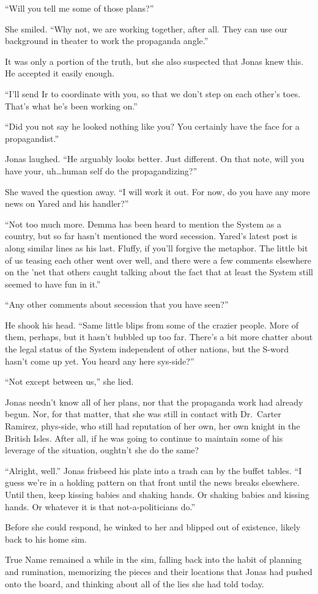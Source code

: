 ``Will you tell me some of those plans?''

She smiled. ``Why not, we are working together, after all. They can use our background in theater to work the propaganda angle.''

It was only a portion of the truth, but she also suspected that Jonas knew this. He accepted it easily enough.

``I'll send Ir to coordinate with you, so that we don't step on each other's toes. That's what he's been working on.''

``Did you not say he looked nothing like you? You certainly have the face for a propagandist.''

Jonas laughed. ``He arguably looks better. Just different. On that note, will you have your, uh\ldots human self do the propagandizing?''

She waved the question away. ``I will work it out. For now, do you have any more news on Yared and his handler?''

``Not too much more. Demma has been heard to mention the System as a country, but so far hasn't mentioned the word secession. Yared's latest post is along similar lines as his last. Fluffy, if you'll forgive the metaphor. The little bit of us teasing each other went over well, and there were a few comments elsewhere on the 'net that others caught talking about the fact that at least the System still seemed to have fun in it.''

``Any other comments about secession that you have seen?''

He shook his head. ``Same little blips from some of the crazier people. More of them, perhaps, but it hasn't bubbled up too far. There's a bit more chatter about the legal status of the System independent of other nations, but the S-word hasn't come up yet. You heard any here sys-side?''

``Not except between us,'' she lied.

Jonas needn't know all of her plans, nor that the propaganda work had already begun. Nor, for that matter, that she was still in contact with Dr.~Carter Ramirez, phys-side, who still had reputation of her own, her own knight in the British Isles. After all, if he was going to continue to maintain some of his leverage of the situation, oughtn't she do the same?

``Alright, well.'' Jonas frisbeed his plate into a trash can by the buffet tables. ``I guess we're in a holding pattern on that front until the news breaks elsewhere. Until then, keep kissing babies and shaking hands. Or shaking babies and kissing hands. Or whatever it is that not-a-politicians do.''

Before she could respond, he winked to her and blipped out of existence, likely back to his home sim.

True Name remained a while in the sim, falling back into the habit of planning and rumination, memorizing the pieces and their locations that Jonas had pushed onto the board, and thinking about all of the lies she had told today.
